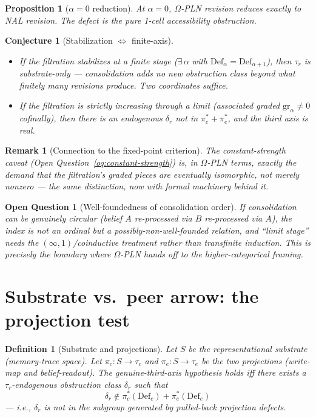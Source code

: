 \documentclass[11pt]{article}
\newtheorem{definition}{Definition}
\newtheorem{conjecture}{Conjecture}
\newtheorem{proposition}{Proposition}
\newtheorem{remark}{Remark}
\newtheorem{openquestion}{Open Question}
\newcommand{\tauc}{\tau_c}
\newcommand{\taur}{\tau_r}
\newcommand{\taue}{\tau_e}
\begin{document}
\begin{proposition}[$\alpha = 0$ reduction]
\label{prop:omega-pln-nal}
At $\alpha = 0$, $\Omega$-PLN revision reduces exactly to NAL revision. The defect is the pure
1-cell accessibility obstruction.
\end{proposition}

\begin{conjecture}[Stabilization $\Leftrightarrow$ finite-axis]
\label{conj:stabilization}
\begin{itemize}
  \item If the filtration stabilizes at a finite stage ($\exists\, \alpha$ with
  $\mathrm{Def}_\alpha = \mathrm{Def}_{\alpha+1}$), then $\taur$ is substrate-only --- consolidation
  adds no new obstruction class beyond what finitely many revisions produce. Two coordinates
  suffice.
  \item If the filtration is strictly increasing through a limit (associated graded
  $\mathrm{gr}_\alpha \neq 0$ cofinally), then there is an endogenous $\delta_r$ not in
  $\pi_c^* + \pi_e^*$, and the third axis is real.
\end{itemize}
\end{conjecture}

\begin{remark}[Connection to the fixed-point criterion]
The constant-strength caveat (Open Question~\ref{oq:constant-strength}) is, in $\Omega$-PLN
terms, exactly the demand that the filtration's graded pieces are eventually isomorphic, not
merely nonzero --- the same distinction, now with formal machinery behind it.
\end{remark}

\begin{openquestion}[Well-foundedness of consolidation order]
\label{oq:well-founded}
If consolidation can be genuinely circular (belief $A$ re-processed via $B$ re-processed via
$A$), the index is not an ordinal but a possibly-non-well-founded relation, and ``limit stage''
needs the $(\infty,1)$/coinductive treatment rather than transfinite induction. This is
precisely the boundary where $\Omega$-PLN hands off to the higher-categorical framing.
\end{openquestion}

\section{Substrate vs.\ peer arrow: the projection test}

\begin{definition}[Substrate and projections]
\label{def:substrate-projections}
Let $S$ be the representational substrate (memory-trace space). Let $\pi_c : S \to \tauc$
and $\pi_e : S \to \taue$ be the two projections (write-map and belief-readout). The
genuine-third-axis hypothesis holds iff there exists a $\taur$-endogenous obstruction class
$\delta_r$ such that
$$
  \delta_r \notin \pi_c^*(\mathrm{Def}_c) + \pi_e^*(\mathrm{Def}_e)
$$
--- i.e., $\delta_r$ is not in the subgroup generated by pulled-back projection defects.
\end{definition}
\end{document}
